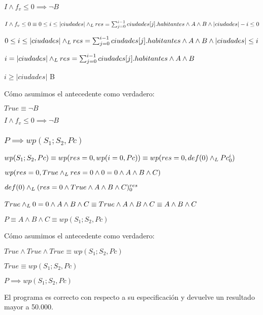 \documentclass[10pt,a4paper]{article}
\begin{document}
\paragraph{$I \wedge f_{v} \leq 0 \implies \neg B$}
$I \wedge f_{v} \leq 0 \equiv 0 \leq i \leq |ciudades| \land _L res = \sum_{j=0}^{i-1} ciudades[j].habitantes \wedge A \wedge B \wedge |ciudades| - i \leq 0$ \equiv \par
\begin{center}
    $0 \leq i \leq |ciudades| \land _L res = \sum_{j=0}^{i-1} ciudades[j].habitantes \wedge A \wedge B \wedge |ciudades| \leq i$ \equiv \par
    \vspace{5px}
    $i = |ciudades| \land _L res = \sum_{j=0}^{i-1} ciudades[j].habitantes \wedge A \wedge B$ \implies \par
    \vspace{5px}
    $i \geq |ciudades|$ \equiv \neg B \par
    \vspace{5px}
\end{center}
\par Cómo asumimos el antecedente como verdadero:
\vspace{5px}
\begin{center}
    $True \equiv \neg B$ \par
    \vspace{5px}
    $I \wedge f_{v} \leq 0 \implies \neg B$
\end{center}

\subsubsection{$P \implies wp(S_{1};S_{2}, Pc)$}
$wp(S_{1};S_{2}, Pc) \equiv wp(res = 0, wp(i = 0, Pc)) \equiv wp(res = 0, def(0) \land _L Pc_{0}^{i})$ \equiv \par
\vspace{5px}
$wp(res = 0, True \land _L res = 0 \wedge 0 = 0 \wedge A \wedge B \wedge C) $ \equiv \par
\vspace{5px}
$def(0) \land _L (res = 0 \wedge True \wedge A \wedge B \wedge C)_{0}^{res} $ \equiv \par
\vspace{5px}
$True \land _L 0 = 0 \wedge A \wedge B \wedge C \equiv True \wedge A \wedge B \wedge C \equiv  A \wedge B \wedge C $ \ \par
\vspace{20px}
$P \equiv A \wedge B \wedge C \equiv  wp(S_{1};S_{2}, Pc)$
\vspace{5px}
\par Cómo asumimos el antecedente como verdadero:
\vspace{5px}
\begin{center}
$True \wedge True \wedge True \equiv wp(S_{1};S_{2}, Pc)$ \par
\vspace{5px}
$True \equiv wp(S_{1};S_{2}, Pc)$ \par
\vspace{5px}
    $P \implies wp(S_{1};S_{2}, Pc)$
\end{center}
\par El programa es correcto con respecto a su especificación y devuelve un resultado mayor a 50.000.
\end{document}
